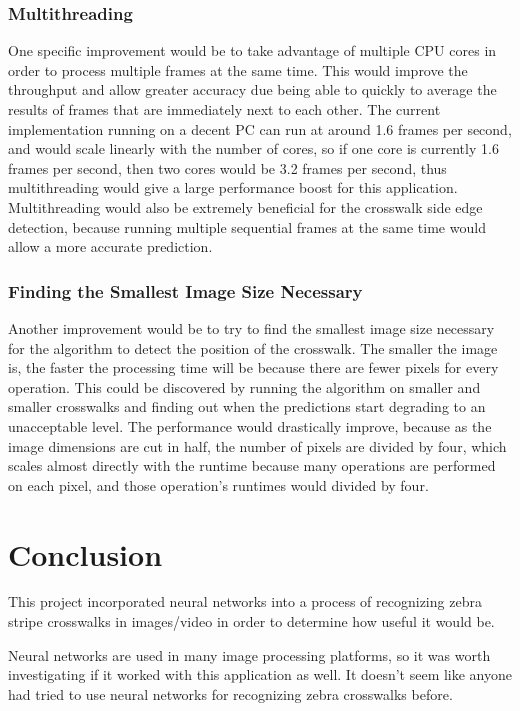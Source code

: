 \documentclass[12pt]{ucthesis}
\begin{document}
\subsection{Multithreading}
One specific improvement would be to take advantage of multiple CPU cores in order to process multiple frames at the same time. This would improve the throughput and allow greater accuracy due being able to quickly to average the results of frames that are immediately next to each other.
The current implementation running on a decent PC can run at around 1.6 frames per second, and would scale linearly with the number of cores, so if one core is currently 1.6 frames per second, then two cores would be 3.2 frames per second, thus multithreading would give a large performance boost for this application. Multithreading would also be extremely beneficial for the crosswalk side edge detection, because running multiple sequential frames at the same time would allow a more accurate prediction.

\subsection{Finding the Smallest Image Size Necessary}
Another improvement would be to try to find the smallest image size necessary for the algorithm to detect the position of the crosswalk. The smaller the image is, the faster the processing time will be because there are fewer pixels for every operation. This could be discovered by running the algorithm on smaller and smaller crosswalks and finding out when the predictions start degrading to an unacceptable level. The performance would drastically improve, because as the image dimensions are cut in half, the number of pixels are divided by four, which scales almost directly with the runtime because many operations are performed on each pixel, and those operation's runtimes would divided by four. 

\chapter{Conclusion}
\label{conclusion}

This project incorporated neural networks into a process of recognizing zebra stripe crosswalks in images/video in order to determine how useful it would be. 

Neural networks are used in many image processing platforms, so it was worth investigating if it worked with this application as well. It doesn't seem like anyone had tried to use neural networks for recognizing zebra crosswalks before.
                                       
\end{document}
